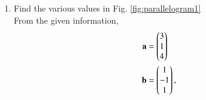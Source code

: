 \begin{enumerate}[label=\thesection.\arabic*.,ref=\thesection.\theenumi]
%
\item Find the various values in Fig. \ref{fig:parallelogram1}
\label{const:parallelogram1}
\\
%
\solution From the given information, 
\begin{align}
\label{eq:constr_a}
\mathbf{a} &= \begin{pmatrix}3\\1\\4\end{pmatrix} 
\\
\mathbf{b} &= \begin{pmatrix}1\\-1\\1\end{pmatrix}, 
\label{eq:constr_b}
\end{align}

%


\end{enumerate}
